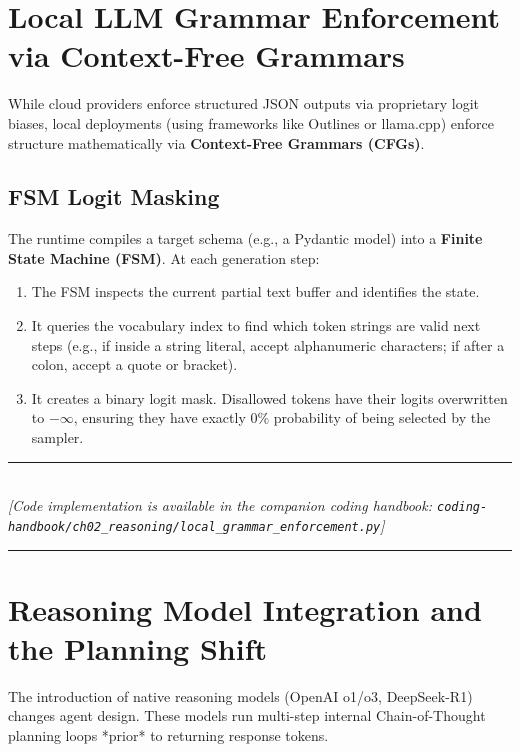 \section{Local LLM Grammar Enforcement via Context-Free Grammars}

While cloud providers enforce structured JSON outputs via proprietary logit biases, local deployments (using frameworks like Outlines or llama.cpp) enforce structure mathematically via \textbf{Context-Free Grammars (CFGs)}.

\subsection{FSM Logit Masking}
The runtime compiles a target schema (e.g., a Pydantic model) into a \textbf{Finite State Machine (FSM)}. At each generation step:
\begin{enumerate}
    \item The FSM inspects the current partial text buffer and identifies the state.
    \item It queries the vocabulary index to find which token strings are valid next steps (e.g., if inside a string literal, accept alphanumeric characters; if after a colon, accept a quote or bracket).
    \item It creates a binary logit mask. Disallowed tokens have their logits overwritten to $-\infty$, ensuring they have exactly $0\%$ probability of being selected by the sampler.
\end{enumerate}

\begin{center}
\noindent\rule{0.6\textwidth}{0.4pt} \\
\vspace{0.3em}
\textit{[Code implementation is available in the companion coding handbook: \texttt{coding-handbook/ch02\_reasoning/local\_grammar\_enforcement.py}]} \\
\noindent\rule{0.6\textwidth}{0.4pt}
\end{center}

\section{Reasoning Model Integration and the Planning Shift}

The introduction of native reasoning models (OpenAI o1/o3, DeepSeek-R1) changes agent design. These models run multi-step internal Chain-of-Thought planning loops *prior* to returning response tokens.

